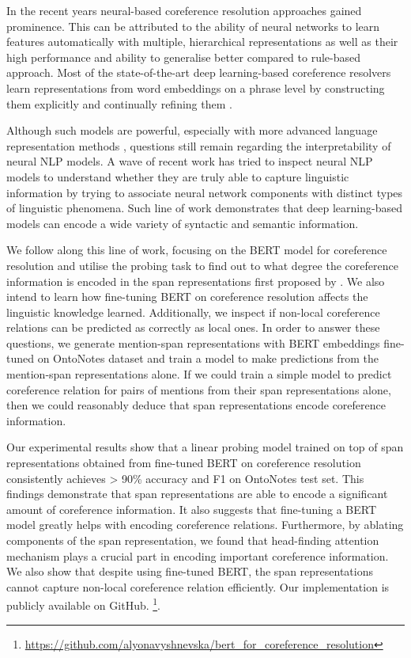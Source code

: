 \documentclass[11pt]{article}
\begin{document}
In the recent years neural-based coreference resolution approaches gained prominence. This can be attributed to the ability of neural networks to learn features automatically with multiple, hierarchical representations as well as their high performance and ability to generalise better compared to rule-based approach. Most of the state-of-the-art deep learning-based coreference resolvers learn representations from word embeddings on a phrase level by constructing them explicitly \parencite{lee2017end} and continually refining them \parencite{lee2018higher,kantor-globerson-2019-coreference}.

Although such models are powerful, especially with more advanced language representation methods \parencite{devlin2019bert,peters2018elmo}, questions still remain regarding the interpretability of neural NLP models. A wave of recent work has tried to inspect neural NLP models to understand whether they are truly able to capture linguistic information by trying to associate neural network components with distinct types of linguistic phenomena. Such line of work \parencite{shi2016string,liu2019linguistic,tenney2019context} demonstrates that deep learning-based models can encode a wide variety of syntactic and semantic information. 

We follow along this line of work, focusing on the BERT model for coreference resolution \parencite{joshi2019coref} and utilise the probing task \parencite{tenney2019context,liu2019linguistic} to find out to what degree the coreference information is encoded in the span representations first proposed by \textcite{lee2017end}. We also intend to learn how fine-tuning BERT on coreference resolution affects the linguistic knowledge learned. Additionally, we inspect if non-local coreference relations can be predicted as  correctly as local ones. In order to answer these questions, we generate mention-span representations with BERT embeddings fine-tuned on OntoNotes dataset \parencite{conll} and train a model to make predictions from the mention-span representations alone. If we could train a simple model to predict coreference relation for pairs of mentions from their span representations alone, then we could reasonably deduce that span representations encode coreference information.

Our experimental results show that a linear probing model trained on top of span representations obtained from fine-tuned BERT on coreference resolution consistently achieves > 90\% accuracy and F1 on OntoNotes test set. This findings demonstrate that span representations are able to encode a significant amount of coreference information. It also suggests that fine-tuning a BERT model greatly helps with encoding coreference relations. Furthermore, by ablating components of the span representation, we found that head-finding attention mechanism plays a crucial part in encoding important coreference information. We also show that despite using fine-tuned BERT, the span representations cannot capture non-local coreference relation efficiently. Our implementation is publicly available on GitHub.  \footnote{\url{https://github.com/alyonavyshnevska/bert_for_coreference_resolution}}.
\end{document}
